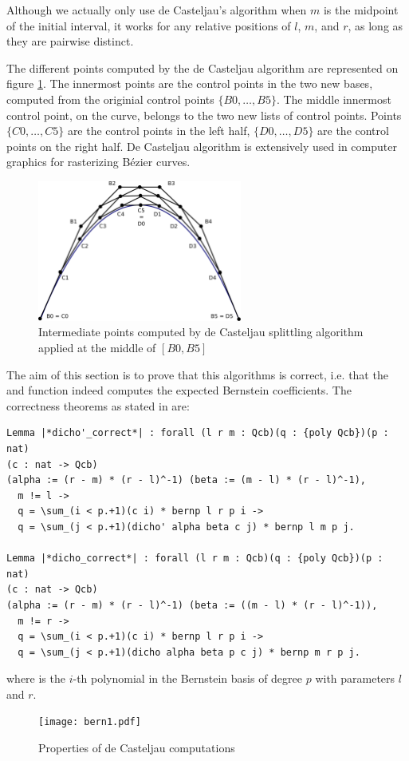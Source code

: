 \documentclass{mscs}
\begin{document}
Although we actually only use de Casteljau's algorithm when \(m\) is
the midpoint of the initial interval, it works for any relative
positions of \(l\), \(m\), and \(r\), as long as they are pairwise distinct.

The different points computed by the de Casteljau algorithm are
represented on figure \ref{dichobern}. The innermost points are the
control points in the two new bases, computed from the originial control
points $\{B0, \dots, B5\}$.
The middle innermost control point, on the curve, belongs to the two
new lists of control points. Points $\{C0, \dots, C5\}$ are the
control points in the left half, $\{D0, \dots, D5\}$ are the control
points on the right half.
De Casteljau algorithm is extensively used in computer  graphics for
rasterizing B{\'e}zier curves.

\begin{figure}[h]
\begin{center}
\includegraphics[width=0.6\textwidth]{dicho_bern.pdf}
\caption{\label{dichobern}Intermediate points computed by de Casteljau
splittling algorithm applied at the middle of $[B0, B5]$}
\end{center}
\end{figure}


The aim of this section is to prove that this algorithms is
correct, i.e. that the  and  function
indeed computes the expected Bernstein coefficients. The correctness
theorems as stated in \Coq{} are:
\begin{lstlisting}
Lemma |*dicho'_correct*| : forall (l r m : Qcb)(q : {poly Qcb})(p : nat)
(c : nat -> Qcb)
(alpha := (r - m) * (r - l)^-1) (beta := (m - l) * (r - l)^-1),
  m != l ->
  q = \sum_(i < p.+1)(c i) * bernp l r p i ->
  q = \sum_(j < p.+1)(dicho' alpha beta c j) * bernp l m p j.

Lemma |*dicho_correct*| : forall (l r m : Qcb)(q : {poly Qcb})(p : nat)
(c : nat -> Qcb)
(alpha := (r - m) * (r - l)^-1) (beta := ((m - l) * (r - l)^-1)),
  m != r ->
  q = \sum_(i < p.+1)(c i) * bernp l r p i ->
  q = \sum_(j < p.+1)(dicho alpha beta p c j) * bernp m r p j.
\end{lstlisting}
where  is the $i$-th polynomial in the Bernstein
basis of degree $p$ with parameters $l$ and $r$.
\begin{figure}[ht]\label{bern}
\begin{center}
\texttt{[image: bern1.pdf]}
\end{center}
\caption{Properties of de Casteljau computations}
\end{figure}
\end{document}
